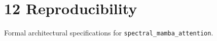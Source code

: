 \section{12 Reproducibility}

Formal architectural specifications for \texttt{spectral_mamba_attention}.
